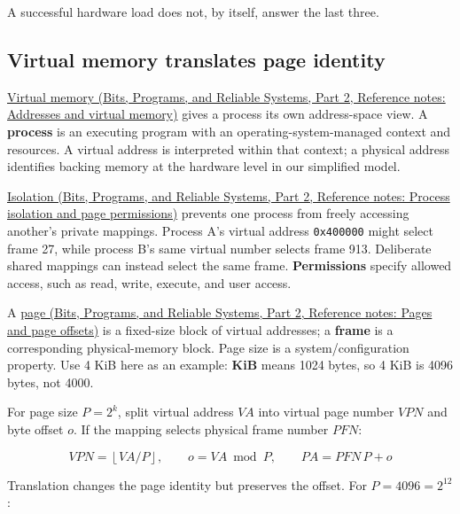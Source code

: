 A successful hardware load does not, by itself, answer the last three.

\subsection{Virtual memory translates page identity}\label{05-engine-i-ch002-virtual-memory-translates-page-identity}

\hypertarget{05-engine-i-ch002-virtual-memory-translates-page-identity}{}

\href{../01-Bits-Programs-and-Reliable-Systems-P02/main.pdf\#nameddest=appendix-18ee4f913c3c}{Virtual memory (Bits, Programs, and Reliable Systems, Part 2, Reference notes: Addresses and virtual memory)} gives a process its own address-space view. A \textbf{process} is an executing program with an operating-system-managed context and resources. A virtual address is interpreted within that context; a physical address identifies backing memory at the hardware level in our simplified model.

\href{../01-Bits-Programs-and-Reliable-Systems-P02/main.pdf\#nameddest=appendix-c2a9ad1e2b49}{Isolation (Bits, Programs, and Reliable Systems, Part 2, Reference notes: Process isolation and page permissions)} prevents one process from freely accessing another's private mappings. Process A's virtual address \texttt{0x400000} might select frame 27, while process B's same virtual number selects frame 913. Deliberate shared mappings can instead select the same frame. \textbf{Permissions} specify allowed access, such as read, write, execute, and user access.

A \href{../01-Bits-Programs-and-Reliable-Systems-P02/main.pdf\#nameddest=appendix-0c67cd5bf30a}{page (Bits, Programs, and Reliable Systems, Part 2, Reference notes: Pages and page offsets)} is a fixed-size block of virtual addresses; a \textbf{frame} is a corresponding physical-memory block. Page size is a system/configuration property. Use 4 KiB here as an example: \textbf{KiB} means 1024 bytes, so 4 KiB is 4096 bytes, not 4000.

For page size \(P=2^k\), split virtual address \(VA\) into virtual page number \(VPN\) and byte offset \(o\). If the mapping selects physical frame number \(PFN\):

\[
VPN=\left\lfloor VA/P\right\rfloor,\qquad
o=VA\bmod P,\qquad
PA=PFN\,P+o
\]

Translation changes the page identity but preserves the offset. For \(P=4096=2^{12}\):

